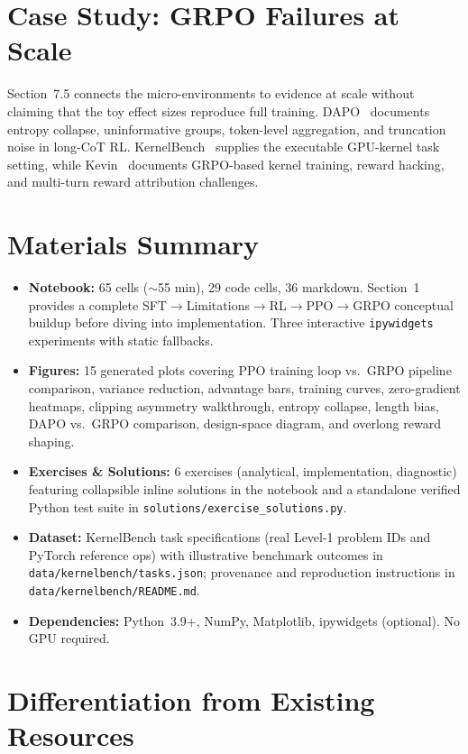 \documentclass{article}
\begin{document}
\section{Case Study: GRPO Failures at Scale}

Section~7.5 connects the micro-environments to evidence at scale without claiming that the toy effect sizes reproduce full training. DAPO~\cite{dapo} documents entropy collapse, uninformative groups, token-level aggregation, and truncation noise in long-CoT RL. KernelBench~\cite{kernelbench} supplies the executable GPU-kernel task setting, while Kevin~\cite{kevin} documents GRPO-based kernel training, reward hacking, and multi-turn reward attribution challenges.

\section{Materials Summary}

\begin{itemize}[nosep,leftmargin=1.5em]
  \item \textbf{Notebook:} 65 cells ($\sim$55 min), 29 code cells, 36 markdown. Section~1 provides a complete SFT$\to$Limitations$\to$RL$\to$PPO$\to$GRPO conceptual buildup before diving into implementation. Three interactive \texttt{ipywidgets} experiments with static fallbacks.
  \item \textbf{Figures:} 15 generated plots covering PPO training loop vs.\ GRPO pipeline comparison, variance reduction, advantage bars, training curves, zero-gradient heatmaps, clipping asymmetry walkthrough, entropy collapse, length bias, DAPO vs.\ GRPO comparison, design-space diagram, and overlong reward shaping.
  \item \textbf{Exercises \& Solutions:} 6 exercises (analytical, implementation, diagnostic) featuring collapsible inline solutions in the notebook and a standalone verified Python test suite in \texttt{solutions/exercise\_solutions.py}.
  \item \textbf{Dataset:} KernelBench task specifications (real Level-1 problem IDs and PyTorch reference ops) with illustrative benchmark outcomes in \texttt{data/kernelbench/tasks.json}; provenance and reproduction instructions in \texttt{data/kernelbench/README.md}.
  \item \textbf{Dependencies:} Python~3.9+, NumPy, Matplotlib, ipywidgets (optional). No GPU required.
\end{itemize}

\section{Differentiation from Existing Resources}
\end{document}
